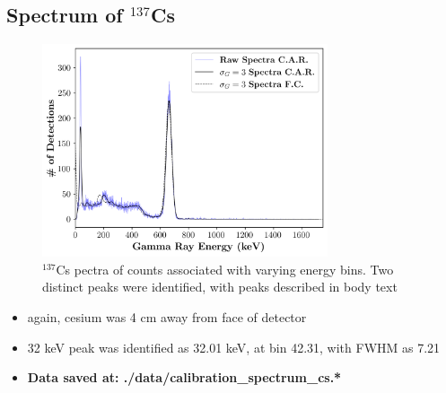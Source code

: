 \documentclass[a4paper]{article}
\begin{document}
\subsection{Spectrum of $^{137}$Cs}
\begin{figure}[H]
    \centering
    \includegraphics[width=0.75\textwidth]{figures/calibration_spectrum_cs_counts_overlay_both_mca.png}
    \caption{$^{137}$Cs pectra of counts associated with varying energy bins. Two distinct peaks were identified, with peaks described in body text}
\end{figure}
\begin{itemize}
    \item again, cesium was 4 cm away from face of detector
    \item 32 keV peak was identified as 32.01 keV, at bin 42.31, with FWHM as 7.21
    \item \textbf{Data saved at: ./data/calibration\_spectrum\_cs.*}
\end{itemize}
\end{document}
